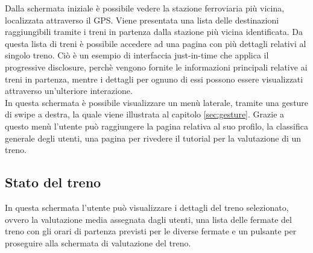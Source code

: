 Dalla schermata iniziale è possibile vedere la stazione ferroviaria più vicina, localizzata attraverso il GPS.
Viene presentata una lista delle destinazioni raggiungibili tramite i treni in partenza dalla stazione più vicina identificata. Da questa lista di treni è possibile accedere ad una pagina con più dettagli relativi al singolo treno.
Ciò è un esempio di interfaccia just-in-time che applica il progressive disclosure, perchè vengono fornite le informazioni principali relative ai treni in partenza, mentre i dettagli per ognuno di essi possono essere visualizzati attraverso un'ulteriore interazione.\\
In questa schermata è possibile visualizzare un menù laterale, tramite una gesture di swipe a destra, la quale viene illustrata al capitolo \ref{sec:gesture}. Grazie a questo menù l'utente può raggiungere la pagina relativa al suo profilo, la classifica generale degli utenti, una pagina per rivedere il tutorial per la valutazione di un treno.
\subsection{Stato del treno}
In questa schermata l'utente può visualizzare i dettagli del treno selezionato, ovvero la valutazione media assegnata dagli utenti, una lista delle fermate del treno con gli orari di partenza previsti per le diverse fermate e un pulsante per proseguire alla schermata di valutazione del treno.

